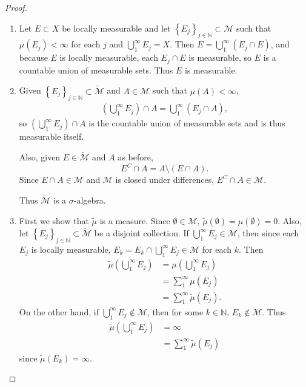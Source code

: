 \documentclass{article}
\theoremstyle{definition}
\begin{document}
\begin{proof}\
	\begin{enumerate}[label=\textbf{\alph*.}]
		\item Let $E \subset X$ be locally measurable and let $\left\lbrace E_j \right\rbrace_{j \in \mathbb{N}} \subset \mathscr{M}$ such that $\mu(E_j) < \infty$ for each $j$ and $\bigcup_1^\infty E_j = X$.
		      Then $E = \bigcup_1^\infty (E_j \cap E)$, and because $E$ is locally measurable, each $E_j \cap E$ is measurable, so $E$ is a countable union of measurable sets.
		      Thus $E$ is measurable.
		\item Given $\left\lbrace E_j \right\rbrace_{j \in \mathbb{N}} \subset \widetilde{\mathscr{M}}$ and $A \in \mathscr{M}$ such that $\mu(A) < \infty$, \begin{align*}
			      \left( \bigcup_1^\infty E_j \right) \cap A = \bigcup_1^\infty (E_j \cap A),
		      \end{align*}
		      so $\left( \bigcup_1^\infty E_j \right) \cap A$ is the countable union of measurable sets and is thus measurable itself.

		      Also, given $E \in \widetilde{\mathscr{M}}$ and $A$ as before, \begin{equation*}
			      E^C \cap A = A \setminus \left( E \cap A \right).
		      \end{equation*}
		      Since $E \cap A \in \mathscr{M}$ and $\mathscr{M}$ is closed under differences, $E^C \cap A \in \mathscr{M}$.

		      Thus $\widetilde{\mathscr{M}}$ is a $\sigma$-algebra.
		\item First we show that $\widetilde{\mu}$ is a measure.
		      Since $\emptyset \in \mathscr{M}$, $\widetilde{\mu}(\emptyset) = \mu(\emptyset) = 0$.
		      Also, let $\left\lbrace E_j \right\rbrace_{j \in \mathbb{N}} \subset \widetilde{\mathscr{M}}$ be a disjoint collection.
		      If $\bigcup_1^\infty E_j \in \mathscr{M}$, then since each $E_j$ is locally measurable, $E_k = E_k \cap \bigcup_1^\infty E_j \in \mathscr{M}$ for each $k$.
		      Then \begin{align*}
			      \widetilde{\mu}\left( \bigcup_1^\infty E_j \right) & = \mu\left( \bigcup_1^\infty E_j \right) \\
			                                                         & = \sum_1^\infty \mu(E_j)                 \\
			                                                         & = \sum_1^\infty \widetilde{\mu}(E_j).
		      \end{align*}
		      On the other hand, if $\bigcup_1^\infty E_j \notin \mathscr{M}$, then for some $k \in \mathbb{N}$, $E_k \notin \mathscr{M}$.
		      Thus \begin{align*}
			      \widetilde{\mu}\left( \bigcup_1^\infty E_j \right) & = \infty                             \\
			                                                         & = \sum_1^\infty \widetilde{\mu}(E_j)
		      \end{align*}
		      since $\widetilde{\mu}(E_k) = \infty$.


\end{enumerate}
\end{proof}
\end{document}
